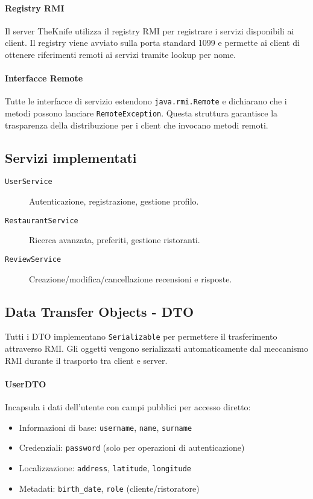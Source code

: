 \paragraph{Registry RMI}
Il server TheKnife utilizza il registry RMI per registrare i servizi disponibili ai client. Il registry viene avviato sulla porta standard 1099 e permette ai client di ottenere riferimenti remoti ai servizi tramite lookup per nome.

\paragraph{Interfacce Remote}
Tutte le interfacce di servizio estendono \texttt{java.rmi.Remote} e dichiarano che i metodi possono lanciare \texttt{RemoteException}. Questa struttura garantisce la trasparenza della distribuzione per i client che invocano metodi remoti.

\subsection{Servizi implementati}
\begin{description}
  \item[\texttt{UserService}] Autenticazione, registrazione, gestione profilo.
  \item[\texttt{RestaurantService}] Ricerca avanzata, preferiti, gestione ristoranti.
  \item[\texttt{ReviewService}] Creazione/modifica/cancellazione recensioni e risposte.
\end{description}

\subsection{Data Transfer Objects - DTO}
Tutti i DTO implementano \texttt{Serializable} per permettere il trasferimento attraverso RMI. Gli oggetti vengono serializzati automaticamente dal meccanismo RMI durante il trasporto tra client e server.
\paragraph{UserDTO}
Incapsula i dati dell'utente con campi pubblici per accesso diretto:
\begin{itemize}
    \item Informazioni di base: \texttt{username}, \texttt{name}, \texttt{surname}
    \item Credenziali: \texttt{password} (solo per operazioni di autenticazione)
    \item Localizzazione: \texttt{address}, \texttt{latitude}, \texttt{longitude}
    \item Metadati: \texttt{birth\_date}, \texttt{role} (cliente/ristoratore)
\end{itemize}

